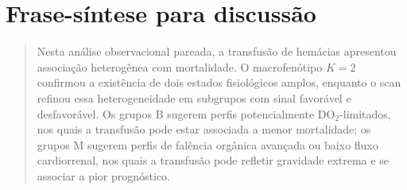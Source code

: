 \section{Frase-síntese para discussão}

\begin{quote}
Nesta análise observacional pareada, a transfusão de hemácias apresentou associação heterogênea com mortalidade. O macrofenótipo $K=2$ confirmou a existência de dois estados fisiológicos amplos, enquanto o scan refinou essa heterogeneidade em subgrupos com sinal favorável e desfavorável. Os grupos B sugerem perfis potencialmente DO$_2$-limitados, nos quais a transfusão pode estar associada a menor mortalidade; os grupos M sugerem perfis de falência orgânica avançada ou baixo fluxo cardiorrenal, nos quais a transfusão pode refletir gravidade extrema e se associar a pior prognóstico.
\end{quote}
